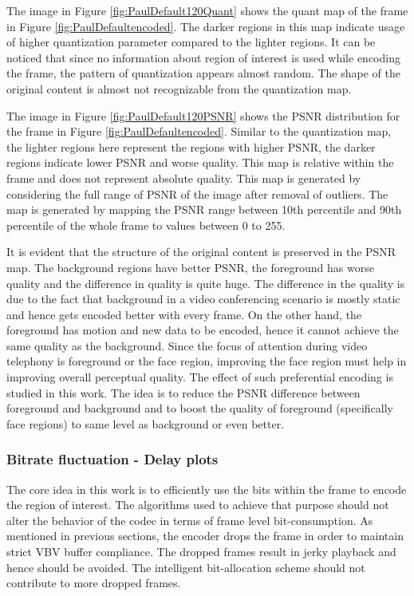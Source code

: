 \documentclass[11pt]{article} %
\begin{document}
The image in Figure \ref{fig:PaulDefault120Quant} shows the quant map of the frame in Figure \ref{fig:PaulDefaultencoded}. The darker regions in this map indicate usage of higher quantization parameter compared to the lighter regions. It can be noticed that since no information about region of interest is used while encoding the frame, the pattern of quantization appears almost random. The shape of the original content is almost not recognizable from the quantization map.

The image in Figure \ref{fig:PaulDefault120PSNR} shows the PSNR distribution for the frame in Figure \ref{fig:PaulDefaultencoded}. Similar to the quantization map, the lighter regions here represent the regions with higher PSNR, the darker regions indicate lower PSNR and worse quality. This map is relative within the frame and does not represent  absolute quality. This map is generated by considering the full range of PSNR of the image after removal of outliers. The map is generated by mapping the PSNR range between 10th percentile and 90th percentile of the whole frame to values between 0 to 255.

It is evident that the structure of the original content is preserved in the PSNR map. The background regions have better PSNR, the foreground has worse quality and the difference in quality is quite huge. The difference in the quality is due to the fact that background in a video conferencing scenario is mostly static and hence gets encoded better with every frame. On the other hand, the foreground has motion and new data to be encoded, hence it cannot achieve the same quality as the background. Since the focus of attention during video telephony is foreground or the face region, improving the face region must help in improving overall perceptual quality. The effect of such preferential encoding is studied in this work. The idea is to reduce the PSNR difference between foreground and background and to boost the quality of foreground (specifically face regions) to same level as background or even better.
\subsubsection{Bitrate fluctuation - Delay plots} \label{sec: setup delay plots}
The core idea in this work is to efficiently use the bits within the frame to encode the region of interest. The algorithms used to achieve that purpose should not alter the behavior of the codec in terms of frame level bit-consumption. As mentioned in previous sections, the encoder drops the frame in order to maintain strict VBV buffer compliance. The dropped frames result in jerky playback and hence should be avoided. The intelligent bit-allocation scheme should not contribute to more dropped frames.
\end{document}
